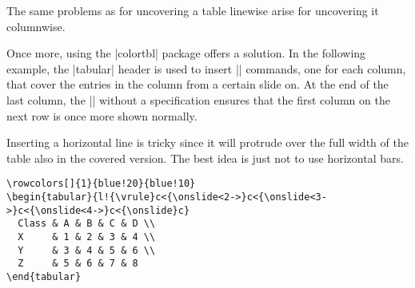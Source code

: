 The same problems as for uncovering a table linewise arise for
uncovering it columnwise.

Once more, using the |colortbl| package offers a solution. In the
following example, the |tabular| header is used to insert |\onslide|
commands, one for each column, that cover the entries in the column
from a certain slide on. At the end of the last column, the |\onslide|
without a specification ensures that the first column on the next row
is once more shown normally.

Inserting a horizontal line is tricky since it will protrude over the
full width of the table also in the covered version. The best idea is
just not to use horizontal bars.

\begin{verbatim}
\rowcolors[]{1}{blue!20}{blue!10}
\begin{tabular}{l!{\vrule}c<{\onslide<2->}c<{\onslide<3->}c<{\onslide<4->}c<{\onslide}c}
  Class & A & B & C & D \\
  X     & 1 & 2 & 3 & 4 \\
  Y     & 3 & 4 & 5 & 6 \\
  Z     & 5 & 6 & 7 & 8
\end{tabular}
\end{verbatim}
